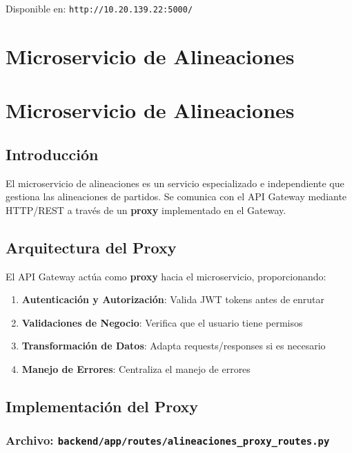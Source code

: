 \documentclass[
  spanish,
  11pt,
  letterpaper,
]{book}
\providecommand{\tightlist}{%
  \setlength{\itemsep}{0pt}\setlength{\parskip}{0pt}}
\begin{document}
Disponible en: \texttt{http://10.20.139.22:5000/}

\chapter{Microservicio de
Alineaciones}\label{microservicio-de-alineaciones-2}

\chapter{Microservicio de
Alineaciones}\label{microservicio-de-alineaciones-3}

\section{Introducción}\label{introducciuxf3n-6}

El microservicio de alineaciones es un servicio especializado e
independiente que gestiona las alineaciones de partidos. Se comunica con
el API Gateway mediante HTTP/REST a través de un \textbf{proxy}
implementado en el Gateway.

\section{Arquitectura del Proxy}\label{arquitectura-del-proxy}

El API Gateway actúa como \textbf{proxy} hacia el microservicio,
proporcionando:

\begin{enumerate}
\def\labelenumi{\arabic{enumi}.}
\tightlist
\item
  \textbf{Autenticación y Autorización}: Valida JWT tokens antes de
  enrutar
\item
  \textbf{Validaciones de Negocio}: Verifica que el usuario tiene
  permisos
\item
  \textbf{Transformación de Datos}: Adapta requests/responses si es
  necesario
\item
  \textbf{Manejo de Errores}: Centraliza el manejo de errores
\end{enumerate}

\section{Implementación del Proxy}\label{implementaciuxf3n-del-proxy}

\subsection{\texorpdfstring{Archivo:
\texttt{backend/app/routes/alineaciones\_proxy\_routes.py}}{Archivo: backend/app/routes/alineaciones\_proxy\_routes.py}}\label{archivo-backendapproutesalineaciones_proxy_routes.py}
\end{document}
